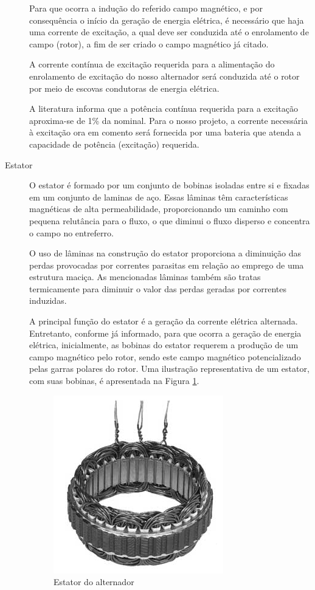 \begin{description}
Para que ocorra a indução do referido campo magnético, e por consequência o início da geração de energia elétrica, é necessário que haja uma corrente de excitação, a qual deve ser conduzida até o enrolamento de campo (rotor), a fim de ser criado o campo magnético já citado. 

A corrente contínua de excitação requerida para a alimentação do enrolamento de excitação do nosso alternador será conduzida até o rotor por meio de escovas condutoras de energia elétrica. 

A literatura informa que a potência contínua requerida para a excitação aproxima-se de 1\% da nominal. Para o nosso projeto, a corrente necessária à excitação ora em comento será fornecida por uma bateria que atenda a capacidade de potência (excitação) requerida.

\item [Estator]

O estator é formado por um conjunto de bobinas isoladas entre si e fixadas em um conjunto de laminas de aço. Essas lâminas têm características magnéticas de alta permeabilidade, proporcionando um caminho com pequena relutância para o fluxo, o que diminui o fluxo disperso e concentra o campo no entreferro. 

O uso de lâminas na construção do estator proporciona a diminuição das perdas provocadas por correntes parasitas em relação ao emprego de uma estrutura maciça. As mencionadas lâminas também são tratas termicamente para diminuir o valor das perdas geradas por correntes induzidas.

A principal função do estator é a geração da corrente elétrica alternada. Entretanto, conforme já informado, para que ocorra a geração de energia elétrica, inicialmente, as bobinas do estator requerem a produção de um campo magnético pelo rotor, sendo este campo magnético potencializado pelas garras polares do rotor. Uma ilustração representativa de um estator, com suas bobinas, é apresentada na Figura \ref{estator-alternador}.

\begin{figure}[h]
	\centering
	\includegraphics[scale=0.8]		{figuras/estator_alternador.png}
	\caption{Estator do alternador}
	\label{estator-alternador}
\end{figure}


\end{description}
